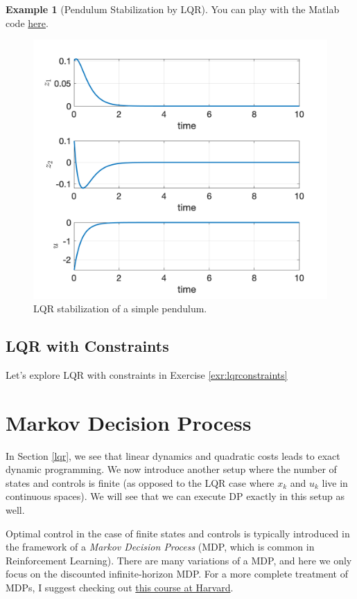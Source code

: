 \documentclass[
]{book}
\theoremstyle{definition}
\theoremstyle{definition}
\newtheorem{example}{Example}[chapter]
\theoremstyle{definition}
\theoremstyle{definition}
\theoremstyle{remark}
\begin{document}
\begin{example}[Pendulum Stabilization by LQR]
You can play with the Matlab code \href{https://github.com/ComputationalRobotics/OptimalControlEstimation-Examples/blob/main/pendulum_stabilization_lqr.m}{here}.

\begin{figure}

{\centering \includegraphics[width=0.6\linewidth]{images/pendulum-stabilization-lqr} 

}

\caption{LQR stabilization of a simple pendulum.}\label{fig:pendulum-stabilization-sim}
\end{figure}

\end{example}

\hypertarget{lqr-with-constraints}{%
\subsection{LQR with Constraints}\label{lqr-with-constraints}}

Let's explore LQR with constraints in Exercise \ref{exr:lqrconstraints}

\hypertarget{mdp-exact-dp}{%
\section{Markov Decision Process}\label{mdp-exact-dp}}

In Section \ref{lqr}, we see that linear dynamics and quadratic costs leads to exact dynamic programming. We now introduce another setup where the number of states and controls is finite (as opposed to the LQR case where \(x_k\) and \(u_k\) live in continuous spaces). We will see that we can execute DP exactly in this setup as well.

Optimal control in the case of finite states and controls is typically introduced in the framework of a \emph{Markov Decision Process} (MDP, which is common in Reinforcement Learning).
There are many variations of a MDP, and here we only focus on the discounted infinite-horizon MDP. For a more complete treatment of MDPs, I suggest checking out \href{https://shamulent.github.io/CS_Stat184_Fall23.html}{this course at Harvard}.
\end{document}
